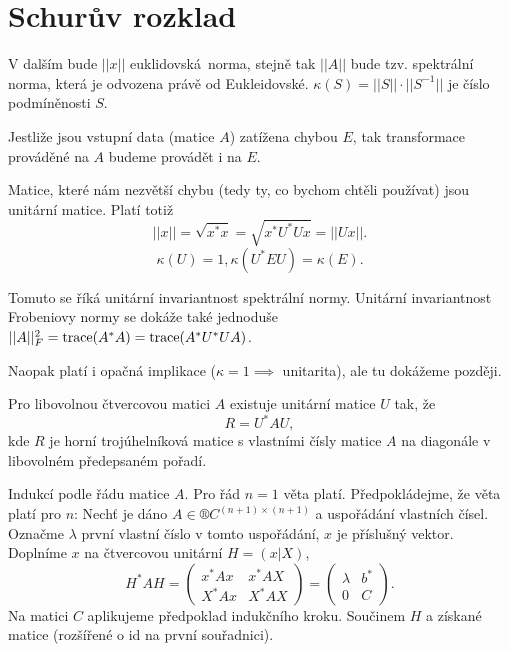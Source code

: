 \documentclass[12pt]{article}					%
\begin{document}

\section{Schurův rozklad}
\begin{definice}
	V dalším bude $||x||$ euklidovská norma, stejně tak $||A||$ bude tzv. spektrální norma, která je odvozena právě od Eukleidovské. $\kappa(S) = ||S||·||S^{-1}||$ je číslo podmíněnosti $S$.
\end{definice}

\begin{poznamka}
	Jestliže jsou vstupní data (matice $A$) zatížena chybou $E$, tak transformace prováděné na $A$ budeme provádět i na $E$.
\end{poznamka}

\begin{poznamka}
	Matice, které nám nezvětší chybu (tedy ty, co bychom chtěli používat) jsou unitární matice. Platí totiž
	$$ ||x|| = \sqrt{x^*x} = \sqrt{x^*U^*Ux} = ||Ux||. $$
	$$ \kappa(U) = 1, \kappa(U^*EU) = \kappa(E). $$

	Tomuto se říká unitární invariantnost spektrální normy. Unitární invariantnost Frobeniovy normy se dokáže také jednoduše $||A||_F^2 = \operatorname{trace}(A^*A) = \operatorname{trace}(A^*U^*UA)$.

	Naopak platí i opačná implikace ($\kappa = 1 \implies$ unitarita), ale tu dokážeme později.
\end{poznamka}

\begin{veta}[Schurova]
	Pro libovolnou čtvercovou matici $A$ existuje unitární matice $U$ tak, že
	$$ R = U^*AU, $$
	kde $R$ je horní trojúhelníková matice s vlastními čísly matice $A$ na diagonále v libovolném předepsaném pořadí.

	\begin{dukazin}
		Indukcí podle řádu matice $A$. Pro řád $n = 1$ věta platí. Předpokládejme, že věta platí pro $n$: Nechť je dáno $A \in ®C^{(n+1)\times(n+1)}$ a uspořádání vlastních čísel. Označme $\lambda$ první vlastní číslo v tomto uspořádání, $x$ je příslušný vektor. Doplníme $x$ na čtvercovou unitární $H = (x|X)$,
		$$ H^* A H = \begin{pmatrix} x^*Ax & x^*AX \\ X^*Ax & X^* AX \end{pmatrix} = \begin{pmatrix} \lambda& b^* \\ 0 & C \end{pmatrix}. $$
		Na matici $C$ aplikujeme předpoklad indukčního kroku. Součinem $H$ a získané matice (rozšířené o id na první souřadnici).
	\end{dukazin}
\end{veta}
\end{document}
